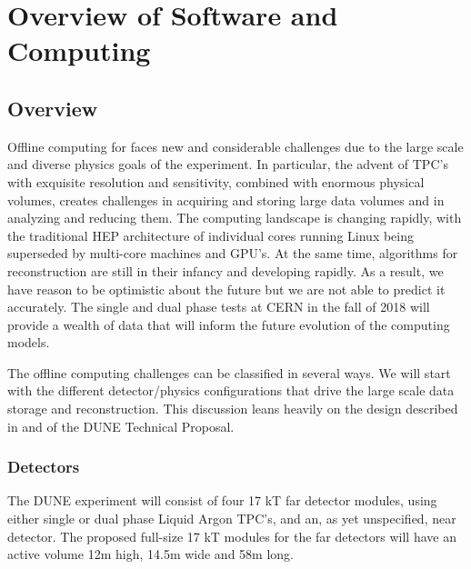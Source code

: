 %
\chapter{Overview of Software and Computing }


\section{Overview}

Offline computing for   faces new and considerable challenges due to the large scale and diverse physics goals of the experiment.  In particular, the advent of  TPC's with exquisite resolution and sensitivity, combined with enormous physical volumes, creates challenges in acquiring and storing large data volumes and in analyzing and reducing them.  The computing landscape is changing rapidly, with the traditional HEP architecture of individual cores running Linux being superseded by multi-core machines and GPU's. At the same time, algorithms for  reconstruction are still in their infancy and developing rapidly.  As a result, we have reason to be optimistic about the future but we are not able to predict it accurately.  The  single and dual phase tests at CERN in the fall of 2018 will provide a wealth of data that will inform the future evolution of  the  computing models.

The   offline computing challenges can be classified in several ways.  We will start with the different detector/physics configurations that drive the large scale data storage and reconstruction. 
This discussion leans heavily on the  design described in \voltitlespfd and \voltitledpfd  of the DUNE Technical Proposal. 

\subsection{Detectors}

The DUNE experiment will consist of four 17 kT far detector modules, using either single or dual phase Liquid Argon TPC's, and an, as yet unspecified, near detector.
The proposed  full-size 17 kT modules for the far detectors will  have an active volume 12m high, 14.5m wide and 58m long. 

